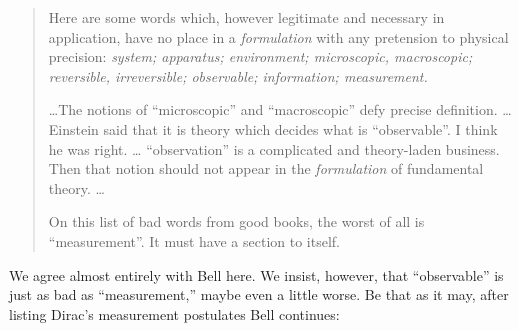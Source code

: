 \documentclass[12pt]{article}
\begin{document}
\begin{quotation}\small\noindent
   Here are some words which, however legitimate and necessary in
   application, have no place in a {\it formulation\/} with any
   pretension to physical precision: {\it system; apparatus;
     environment; microscopic, macroscopic; reversible, irreversible;
     observable; information; measurement.\/}

   \dots The notions of ``microscopic'' and ``macroscopic'' defy
   precise definition. \dots Einstein said that it is theory which
   decides what is ``observable''.  I think he was right. \dots
   ``observation'' is a complicated and theory-laden business.  Then
   that notion should not appear in the {\it formulation\/} of
   fundamental theory. \dots

   On this list of bad words {}from good books, the worst of all is
   ``measurement''.  It must have a section to itself.~\cite{Bel90}
\end{quotation}

We agree almost entirely with Bell here.  We insist, however, that
``observable'' is just as bad as ``measurement,'' maybe even a little
worse.  Be that as it may, after listing Dirac's measurement
postulates Bell continues:
\end{document}
